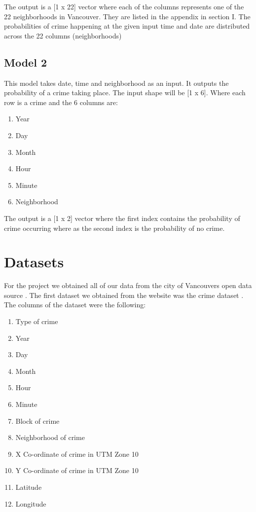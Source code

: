 \documentclass[conference]{IEEEtran}
\begin{document}
    The output is a [1 x 22] vector where each of the columns represents one of the
    22 neighborhoods in Vancouver. They are listed in the appendix in section I. The
    probabilities of crime happening at the given input time and date are distributed
    across the 22 columns (neighborhoods)

    \subsection{Model 2}

    This model takes date, time and neighborhood as an input. It outputs the probability
    of a crime taking place. The input shape will be [1 x 6]. Where each row is a crime
    and the 6 columns are:

    \begin{enumerate}
        \item Year
        \item Day
        \item Month
        \item Hour
        \item Minute
        \item Neighborhood
    \end{enumerate}

    The output is a [1 x 2] vector where the first index contains the probability of
    crime occurring where as the second index is the probability of no crime.
    
    \section{Datasets}

    For the project we obtained all of our data from the city of
    Vancouvers open data source \cite{DT}. The first dataset we
    obtained from the website was the crime dataset \cite{DT_C}.
    The columns of the dataset were the following:\\

    \begin{enumerate}
        \item Type of crime
        \item Year
        \item Day
        \item Month
        \item Hour
        \item Minute
        \item Block of crime
        \item Neighborhood of crime
        \item X Co-ordinate of crime in UTM Zone 10
        \item Y Co-ordinate of crime in UTM Zone 10
        \item Latitude
        \item Longitude\\
    \end{enumerate}
\end{document}
